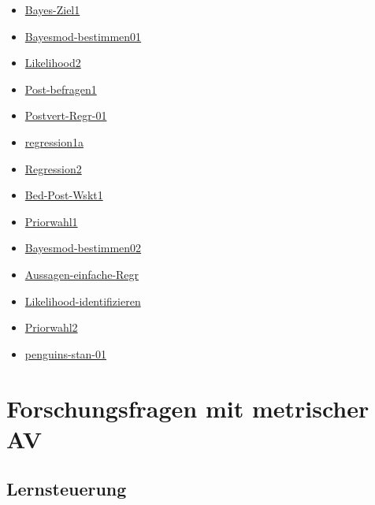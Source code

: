 \documentclass[
  a4paper,
  DIV=11]{scrreprt}
\providecommand{\tightlist}{%
  \setlength{\itemsep}{0pt}\setlength{\parskip}{0pt}}\usepackage{longtable,booktabs,array}
\theoremstyle{definition}
\theoremstyle{remark}
\begin{document}
\begin{itemize}
\tightlist
\item
  \href{https://datenwerk.netlify.app/posts/bayes-ziel1/bayes-ziel1}{Bayes-Ziel1}
\item
  \href{https://datenwerk.netlify.app/posts/bayesmod-bestimmen01/bayesmod-bestimmen01}{Bayesmod-bestimmen01}
\item
  \href{https://datenwerk.netlify.app/posts/likelihood2/likelihood2}{Likelihood2}
\item
  \href{https://datenwerk.netlify.app/posts/post-befragen1/post-befragen1}{Post-befragen1}
\item
  \href{https://datenwerk.netlify.app/posts/postvert-regr-01/postvert-regr-01}{Postvert-Regr-01}
\item
  \href{https://datenwerk.netlify.app/posts/regression1a/regression1a.html}{regression1a}
\item
  \href{https://datenwerk.netlify.app/posts/regression2/regression2}{Regression2}
\item
  \href{https://datenwerk.netlify.app/posts/bed-post-wskt1/bed-post-wskt1}{Bed-Post-Wskt1}
\item
  \href{https://datenwerk.netlify.app/posts/priorwahl1/priorwahl1}{Priorwahl1}
\item
  \href{https://datenwerk.netlify.app/posts/bayesmod-bestimmen02/bayesmod-bestimmen02}{Bayesmod-bestimmen02}
\item
  \href{https://datenwerk.netlify.app/posts/aussagen-einfache-regr/aussagen-einfache-regr}{Aussagen-einfache-Regr}
\item
  \href{https://datenwerk.netlify.app/posts/likelihood-identifizieren/likelihood-identifizieren}{Likelihood-identifizieren}
\item
  \href{https://datenwerk.netlify.app/posts/priorwahl2/priorwahl2}{Priorwahl2}
\item
  \href{https://datenwerk.netlify.app/posts/penguins-stan-01/penguins-stan-01.html}{penguins-stan-01}
\end{itemize}


\hypertarget{forschungsfragen-mit-metrischer-av}{%
\chapter{Forschungsfragen mit metrischer
AV}\label{forschungsfragen-mit-metrischer-av}}

\hypertarget{lernsteuerung-8}{%
\section{Lernsteuerung}\label{lernsteuerung-8}}
\end{document}
